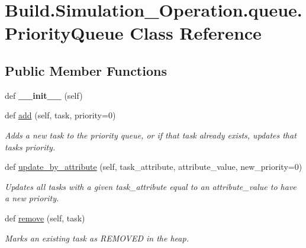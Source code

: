 \hypertarget{class_build_1_1_simulation___operation_1_1queue_1_1_priority_queue}{}\section{Build.\+Simulation\+\_\+\+Operation.\+queue.\+Priority\+Queue Class Reference}
\label{class_build_1_1_simulation___operation_1_1queue_1_1_priority_queue}
\subsection*{Public Member Functions}
\begin{DoxyCompactItemize}
\item 
\mbox{\label{class_build_1_1_simulation___operation_1_1queue_1_1_priority_queue_aee409aeb79269e2167c83cecdd3b2db2}} 
def {\bfseries \+\_\+\+\_\+init\+\_\+\+\_\+} (self)
\item 
def \hyperlink{class_build_1_1_simulation___operation_1_1queue_1_1_priority_queue_a042956dd1eaf2317965630e8deed80b3}{add} (self, task, priority=0)
\begin{DoxyCompactList}\small\item\em Adds a new task to the priority queue, or if that task already exists, updates that tasks priority. \end{DoxyCompactList}\item 
def \hyperlink{class_build_1_1_simulation___operation_1_1queue_1_1_priority_queue_af953e022ce390c5090ebe7de4f1ea6ec}{update\+\_\+by\+\_\+attribute} (self, task\+\_\+attribute, attribute\+\_\+value, new\+\_\+priority=0)
\begin{DoxyCompactList}\small\item\em Updates all tasks with a given task\+\_\+attribute equal to an attribute\+\_\+value to have a new priority. \end{DoxyCompactList}\item 
def \hyperlink{class_build_1_1_simulation___operation_1_1queue_1_1_priority_queue_a86faaf2d1f76eb146b6e1d5a55df09ba}{remove} (self, task)
\begin{DoxyCompactList}\small\item\em Marks an existing task as R\+E\+M\+O\+V\+ED in the heap. \end{DoxyCompactList}\item 

\end{DoxyCompactItemize}

